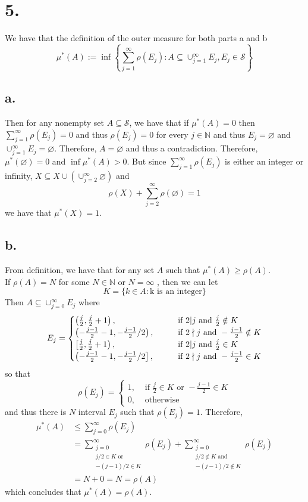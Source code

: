 \documentclass[11pt]{article}
\theoremstyle{mystyle}
\theoremstyle{definition}
\begin{document}
\section*{5.}
We have that the definition of the outer measure for both parts a and b
\[
  \mu^*(A) := \inf \left\{\sum_{j=1}^\infty \rho(E_j): A \subseteq \cup_{j=1}^\infty E_j, E_j \in \mathcal{S} \right\}
\]
\subsection*{a.}
Then for any nonempty set $A \subseteq \mathcal{S}$, we have that if $\mu^*(A) = 0$ then $\sum_{j=1}^\infty \rho(E_j) = 0$ and thus $\rho(E_j) = 0$ for every $j \in \mathbb{N}$ and thus $E_j = \varnothing$ and $\cup_{j=1}^\infty E_j = \varnothing$. Therefore, $A = \varnothing$ and thus a contradiction. Therefore, $\mu^*(\varnothing) = 0$ and $\inf \mu^*(A) > 0$. But since $\sum_{j=1}^\infty \rho(E_j)$ is either an integer or infinity, $X \subseteq X \cup (\cup_{j=2}^\infty \varnothing)$ and 
\[
  \rho(X) + \sum_{j=2}^\infty \rho(\varnothing) = 1
\]
we have that $\mu^*(X) = 1$. 
\subsection*{b.}
From definition, we have that for any set $A$ such that $\mu^*(A) \ge \rho(A)$. \\ 
If $\rho(A) = N$ for some $N \in \mathbb{N}$ or $N = \infty$ , then we can let 
\[
  K = \{k \in A: \text{k is an integer} \}
\]
Then $A \subseteq \cup_{j=0}^\infty E_j$ where 
\[
  E_j = 
  \begin{cases}
    \left(\frac{j}{2},\frac{j}{2} + 1\right), \indent &\text{ if } 2|j \text{ and } \frac{j}{2} \notin K\\
    \left(-\frac{j-1}{2} -1,-\frac{j-1}{2}/2\right), \indent &\text{ if } 2\nmid j \text{ and } -\frac{j-1}{2} \notin K \\
    \left[\frac{j}{2},\frac{j}{2} + 1\right), \indent &\text{ if } 2|j \text{ and } \frac{j}{2} \in K \\
    \left(-\frac{j-1}{2} -1,-\frac{j-1}{2}/2\right], \indent &\text{ if } 2\nmid j \text{ and } -\frac{j-1}{2} \in K \\
  \end{cases}
\]
so that 
\[
  \rho(E_j) = 
  \begin{cases}
    1, &\text{ if } \frac{j}{2} \in K \text{ or } -\frac{j-1}{2} \in K \\
    0, &\text{ otherwise}
  \end{cases}
\]
and thus there is $N$ interval $E_j$ such that $\rho(E_j) = 1$. Therefore,
\begin{align*}  
  \mu^*(A) 
  &\le \sum_{j=0}^\infty \rho(E_j) \\
  &=  \sum_{\substack{j=0 \\ j/2 \in K \text{ or } \\ -(j-1)/2 \in K}}^\infty \rho(E_j) 
  +  \sum_{\substack{j=0 \\ j/2 \notin K \text{ and } \\ -(j-1)/2 \notin K}}^\infty \rho(E_j) \\
  &= N + 0 = N = \rho(A) 
\end{align*}
which concludes that $\mu^*(A) = \rho(A)$. 
\end{document}
